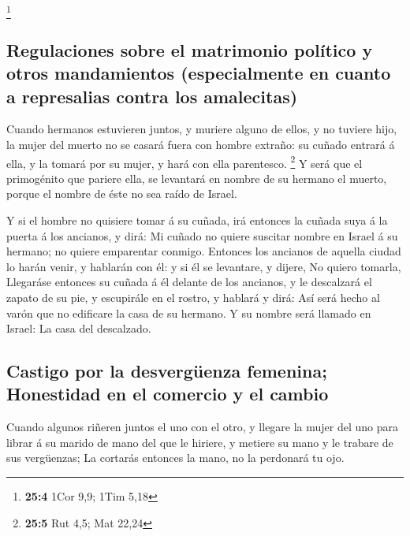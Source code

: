 \footnote{\textbf{25:4} 1Cor 9,9; 1Tim 5,18}

\hypertarget{regulaciones-sobre-el-matrimonio-poluxedtico-y-otros-mandamientos-especialmente-en-cuanto-a-represalias-contra-los-amalecitas}{%
\subsection{Regulaciones sobre el matrimonio político y otros
mandamientos (especialmente en cuanto a represalias contra los
amalecitas)}\label{regulaciones-sobre-el-matrimonio-poluxedtico-y-otros-mandamientos-especialmente-en-cuanto-a-represalias-contra-los-amalecitas}}

 Cuando hermanos estuvieren juntos, y muriere alguno de
ellos, y no tuviere hijo, la mujer del muerto no se casará fuera con
hombre extraño: su cuñado entrará á ella, y la tomará por su mujer, y
hará con ella parentesco. \footnote{\textbf{25:5} Rut 4,5; Mat 22,24}
 Y será que el primogénito que pariere ella, se levantará
en nombre de su hermano el muerto, porque el nombre de éste no sea raído
de Israel.

 Y si el hombre no quisiere tomar á su cuñada, irá
entonces la cuñada suya á la puerta á los ancianos, y dirá: Mi cuñado no
quiere suscitar nombre en Israel á su hermano; no quiere emparentar
conmigo.  Entonces los ancianos de aquella ciudad lo harán
venir, y hablarán con él: y si él se levantare, y dijere, No quiero
tomarla,  Llegaráse entonces su cuñada á él delante de los
ancianos, y le descalzará el zapato de su pie, y escupirále en el
rostro, y hablará y dirá: Así será hecho al varón que no edificare la
casa de su hermano.  Y su nombre será llamado en Israel:
La casa del descalzado.

\hypertarget{castigo-por-la-desverguxfcenza-femenina-honestidad-en-el-comercio-y-el-cambio}{%
\subsection{Castigo por la desvergüenza femenina; Honestidad en el
comercio y el
cambio}\label{castigo-por-la-desverguxfcenza-femenina-honestidad-en-el-comercio-y-el-cambio}}

 Cuando algunos riñeren juntos el uno con el otro, y
llegare la mujer del uno para librar á su marido de mano del que le
hiriere, y metiere su mano y le trabare de sus vergüenzas;
 La cortarás entonces la mano, no la perdonará tu ojo.

